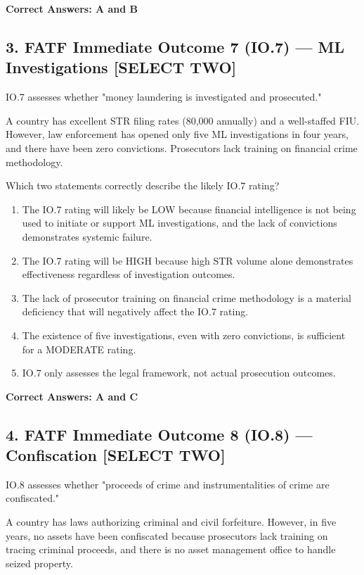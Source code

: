 \documentclass[11pt,a4paper]{article}
\begin{document}
	\textbf{Correct Answers: A and B}
	
	\subsection{3. FATF Immediate Outcome 7 (IO.7) — ML Investigations \textnormal{[SELECT TWO]}}
	
	IO.7 assesses whether "money laundering is investigated and prosecuted."
	
	A country has excellent STR filing rates (80,000 annually) and a well-staffed FIU. However, law enforcement has opened only five ML investigations in four years, and there have been zero convictions. Prosecutors lack training on financial crime methodology.
	
	Which two statements correctly describe the likely IO.7 rating?
	
	\begin{enumerate}[label=\Alph*.]
		\item The IO.7 rating will likely be LOW because financial intelligence is not being used to initiate or support ML investigations, and the lack of convictions demonstrates systemic failure.
		\item The IO.7 rating will be HIGH because high STR volume alone demonstrates effectiveness regardless of investigation outcomes.
		\item The lack of prosecutor training on financial crime methodology is a material deficiency that will negatively affect the IO.7 rating.
		\item The existence of five investigations, even with zero convictions, is sufficient for a MODERATE rating.
		\item IO.7 only assesses the legal framework, not actual prosecution outcomes.
	\end{enumerate}
	
	\textbf{Correct Answers: A and C}
	
	\subsection{4. FATF Immediate Outcome 8 (IO.8) — Confiscation \textnormal{[SELECT TWO]}}
	
	IO.8 assesses whether "proceeds of crime and instrumentalities of crime are confiscated."
	
	A country has laws authorizing criminal and civil forfeiture. However, in five years, no assets have been confiscated because prosecutors lack training on tracing criminal proceeds, and there is no asset management office to handle seized property.
	
\end{document}
